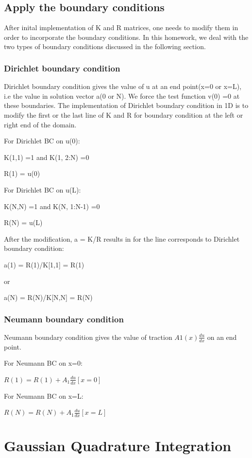 \documentclass[paper=a4, fontsize=11pt]{article} %
\begin{document}
\subsection{Apply the boundary conditions}

 After inital implementation of K and R matrices, one needs to modify them in order to incorporate the boundary conditions. In this homework, we deal with the two types of boundary conditions discussed in the following section.

\subsubsection{Dirichlet boundary condition}
Dirichlet boundary condition gives the value of u at an end point(x=0 or x=L), i.e the value in solution vector a(0 or N). We force the test function v(0) =0 at these boundaries. The implementation of Dirichlet boundary condition in 1D is to modify the first or the last line of K and R for boundary condition at the left or right end of the domain.

For Dirichlet BC on u(0):

\indent K(1,1) =1 and K(1, 2:N) =0 

R(1) = u(0)

For Dirichlet BC on u(L):

K(N,N) =1 and K(N, 1:N-1) =0 

R(N) = u(L)

After the modification, a = K/R results in for the line corresponds to Dirichlet boundary condition: 

a(1) = R(1)/K[1,1] = R(1)

or
 
a(N) = R(N)/K[N,N] = R(N) 

\subsubsection{Neumann boundary condition}
Neumann boundary condition gives the value of traction $A1(x)\frac{du}{dx}$ on an end point.

For Neumann BC on x=0:

 $R(1) = R(1) + A_1 \frac{du}{dx}[x=0] $


For Neumann BC on x=L:

 $R(N)=R(N)+ A_1 \frac{du}{dx}[x=L] $

\section{Gaussian Quadrature Integration}
\end{document}
